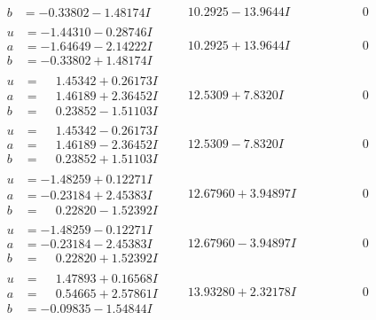 \documentclass[1p]{elsarticle_modified}
\theoremstyle{definition}
\begin{document}
$$\begin{array}{c|c|c}
\begin{aligned}
b &= -0.33802 - 1.48174 I\end{aligned}
 & \phantom{-}10.2925 - 13.9644 I & \phantom{-0.000000 } 0 \\ \hline\begin{aligned}
u &= -1.44310 - 0.28746 I \\
a &= -1.64649 - 2.14222 I \\
b &= -0.33802 + 1.48174 I\end{aligned}
 & \phantom{-}10.2925 + 13.9644 I & \phantom{-0.000000 } 0 \\ \hline\begin{aligned}
u &= \phantom{-}1.45342 + 0.26173 I \\
a &= \phantom{-}1.46189 + 2.36452 I \\
b &= \phantom{-}0.23852 - 1.51103 I\end{aligned}
 & \phantom{-}12.5309 + 7.8320 I & \phantom{-0.000000 } 0 \\ \hline\begin{aligned}
u &= \phantom{-}1.45342 - 0.26173 I \\
a &= \phantom{-}1.46189 - 2.36452 I \\
b &= \phantom{-}0.23852 + 1.51103 I\end{aligned}
 & \phantom{-}12.5309 - 7.8320 I & \phantom{-0.000000 } 0 \\ \hline\begin{aligned}
u &= -1.48259 + 0.12271 I \\
a &= -0.23184 + 2.45383 I \\
b &= \phantom{-}0.22820 - 1.52392 I\end{aligned}
 & \phantom{-}12.67960 + 3.94897 I & \phantom{-0.000000 } 0 \\ \hline\begin{aligned}
u &= -1.48259 - 0.12271 I \\
a &= -0.23184 - 2.45383 I \\
b &= \phantom{-}0.22820 + 1.52392 I\end{aligned}
 & \phantom{-}12.67960 - 3.94897 I & \phantom{-0.000000 } 0 \\ \hline\begin{aligned}
u &= \phantom{-}1.47893 + 0.16568 I \\
a &= \phantom{-}0.54665 + 2.57861 I \\
b &= -0.09835 - 1.54844 I\end{aligned}
 & \phantom{-}13.93280 + 2.32178 I & \phantom{-0.000000 } 0 \\ \hline\begin{aligned}

\end{aligned}
\end{array}$$
\end{document}
